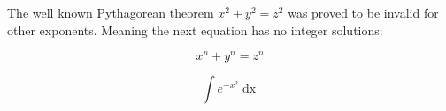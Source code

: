\documentclass[12pt]{article}
\begin{document}
The well known Pythagorean theorem $x^2 + y^2 = z^2$ was
proved to be invalid for other exponents.
Meaning the next equation has no integer solutions:

$$ x^n + y^n = z^n $$

$$ \int e^{-x^2} \mathop{dx}$$
\end{document}
